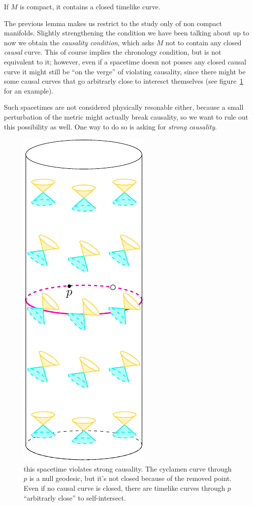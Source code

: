 \begin{lemma}
	If \(M\) is compact, it contains a closed timelike curve.
\end{lemma}
The previous lemma makes us restrict to the study only of non compact manifolds.
Slightly strengthening the condition we have been talking about up to now we obtain the \emph{causality condition}, which asks \(M\) not to contain any closed \emph{causal} curve. This of course implies the chronology condition, but is not equivalent to it; however, even if a spacetime doesn not posses any closed causal curve it might still be ``on the verge'' of violating causality, since there might be some causal curves that go arbitrarly close to interesct themselves (see figure~\ref{fig:strong-causality} for an example).

Such spacetimes are not considered physically resonable either, because a small perturbation of the metric might actually break causality, so we want to rule out this possibility as well. One way to do so is asking for \emph{strong causality}.
\begin{figure}
	\centering
	\includegraphics[scale=1.1]{Immagini/strong-causality/strong-causality.pdf}
	\caption[]{this spacetime violates strong causality. The cyclamen curve through \(p\) is a null geodesic, but it's not closed because of the removed point. Even if no causal curve is closed, there are timelike curves through \(p\) ``arbitrarly close'' to self-intersect.}
	\label{fig:strong-causality}
\end{figure}
